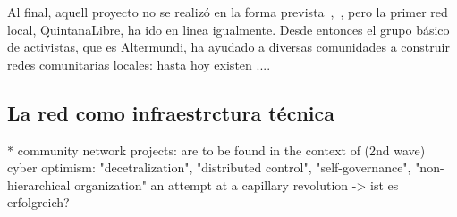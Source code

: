 \begin{comment}
2017
* Julio: el decreto de Macri llega al Corte Suprema, que aun ha de pronunciarse hacia su legalidad
* Octubre: planificado el lanzamiento del libre router
pliegues de redes comunitarias en Argentina

Las redes aquí enumeradas utilizan tecnología desarrollada por AlterMundi y reciben soporte y asistencia de parte de la Asociación.

QuintanaLibre, Córdoba, iniciada en Marzo de 2012 
DeltaLibre, Buenos Aires, iniciada en Abril de 2012 
AnisacateLibre, Córdoba, iniciada en Septiembre de 2012 
LaSerranitaLibre, Córdoba, iniciada en Septiembre de 2013 
NonoLibre, Córdoba, Iniciada en Marzo de 2014 
BoquerónLibre, Santiago del Estero, Abril de 2015 
LaBolsaLibre, Córdoba, iniciada en Mayo de 2015

Despliegues de redes comunitarias en el exterior

Fumaça Online, Río de Janeiro, Brasil, Julio de 2015
MulukukuLibre, Nicaragua, Enero de 2016
Caimito Libre, Esmeraldas, Febrero de 2017
\end{comment}

Al final, aquell proyecto no se realizó en la forma prevista~\autocite{Vaseva2016a},~\autocite{iv-nico-pillku}, pero la primer red local, QuintanaLibre, ha ido en linea igualmente.
Desde entonces el grupo básico de activistas, que es Altermundi, ha ayudado a diversas comunidades a construir redes comunitarias locales:
hasta hoy existen ....

\subsection{La red como infraestrctura técnica}
* community network projects: are to be found in the context of (2nd wave) cyber optimism: "decetralization", "distributed control", "self-governance", "non-hierarchical organization"
an attempt at a capillary revolution -> ist es erfolgreich?


\begin{comment}
[Latour2010]
"the technology.. /digital technology .. makes networks material and explicit" (infrastruktur ist präsent und sichtbar im öffentlichen Raum) --> wem gehört die Infrastruktur? wer kontrolliert die? Wer hat (physischen) Zugang dazu?
"he expansion of digitality has
enormously increased the material dimension of networks: the more digital, the less
virtual and the more material a given activity becomes." <-- das ist das Exaktzitat


"subversion it introduces in the notion of distance (the adjectives “close” and “far” are
made dependant on the presence of conduits, bridges, and hubs)," <-- physical network
\end{comment}

